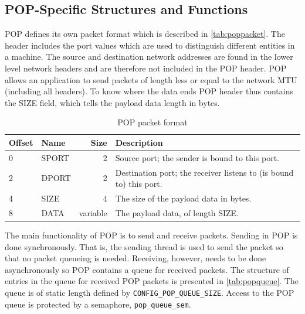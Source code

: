 \documentclass[twoside,a4paper]{report}
\newcommand{\PBS}[1]{\let\temp=\\#1\let\\=\temp}
\newlength{\tablewidth}
\begin{document}
\subsection{POP-Specific Structures and Functions}
\label{sec:popspecific}

POP defines its own packet format which is described in
\autoref{tab:poppacket}. The header includes the port values which are
used to distinguish different entities in a machine. The source and
destination network addresses are found in the lower level network
headers and are therefore not included in the POP header. POP allows
an application to send packets of length less or equal to the network
MTU (including all headers). To know where the data ends POP header
thus contains the SIZE field, which tells the payload data length in
bytes.

\begin{table}
\begin{center}

\begin{tabularx}{\tablewidth}{l|l|r|>{\PBS\raggedright}X}
\textbf{Offset} & \textbf{Name} & \textbf{Size} & \textbf{Description} \\
\hline
0 & SPORT & 2 & Source port; the sender is bound to this port.\\
\hline
2 & DPORT & 2 & Destination port; the receiver listens to (is bound
to) this port. \\
\hline
4 & SIZE & 4 & The size of the payload data in bytes. \\
\hline
8 & DATA & variable & The payload data, of length SIZE. \\
\end{tabularx}
\end{center}
\caption{POP packet format}
\label{tab:poppacket}
\end{table}

  The main functionality of POP is
to send and receive packets. Sending in POP is done synchronously.
That is, the sending thread is used to send the packet so that no
packet queueing is needed. Receiving, however, needs to be done
asynchronously so POP contains a queue for received packets. The
structure of entries in the queue for received POP packets is
presented in \autoref{tab:popqueue}. The queue is of static length
defined by
\texttt{CONFIG\_POP\_QUEUE\_SIZE}.
Access to the POP queue is protected by a semaphore,
\texttt{pop\_queue\_sem}.
\end{document}
